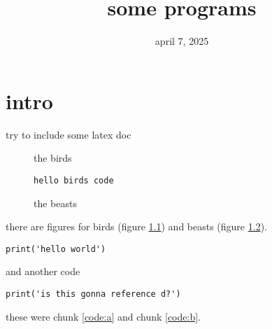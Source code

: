 \documentclass[a4paper]{report}
\begin{document}

\title{some programs}
\date{april 7, 2025}

\maketitle

{\sffamily
\tableofcontents
}

\chapter{intro}\label{ch:intro}


try to include some latex doc

\begin{figure}[h!]
  \caption{the birds}
  \label{fig:birds}
\end{figure}

\begin{figure}[h!]
\begin{verbatim}
hello birds code
\end{verbatim}
  \caption{the beasts}
  \label{fig:beasts}
\end{figure}

there are figures for birds (figure \ref{fig:birds}) and beasts (figure \ref{fig:beasts}).



\begin{code}
  

\begin{verbatim}
print('hello world')
\end{verbatim}

\captionlistentry{}
\label{code:a}

\end{code}

and another code

\begin{code}
\begin{verbatim}
print('is this gonna reference d?')
\end{verbatim}
\captionlistentry{}
\label{code:b}
\end{code}

these were chunk \ref{code:a} and chunk \ref{code:b}.
\end{document}
